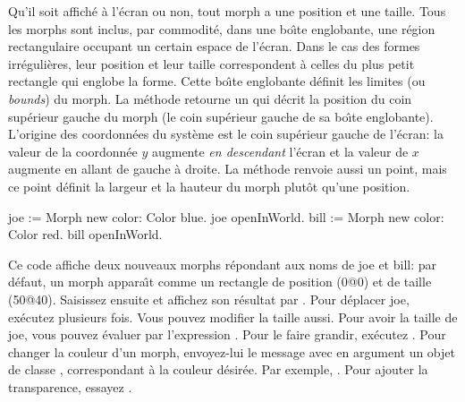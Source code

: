 \documentclass[a4paper,10pt,twoside]{book}
\begin{document}
Qu'il soit affich\'e \`a l'\'ecran ou non, tout morph a une position
et une taille. Tous les morphs sont inclus, par commodit\'e, dans une
bo\^{\i}te englobante, \cad une r\'egion rectangulaire occupant un
certain espace de l'\'ecran. Dans le cas des formes irr\'eguli\`eres,
leur position et leur taille correspondent \`a celles du plus petit
rectangle qui englobe la forme. Cette bo\^{\i}te englobante d\'efinit
les limites (ou \emph{bounds}) du morph. %
La m\'ethode  retourne un  qui
d\'ecrit la position du coin sup\'erieur gauche du morph (\cad le coin
sup\'erieur gauche de sa bo\^{\i}te englobante).
L'origine des coordonn\'ees du syst\`eme est le coin sup\'erieur
gauche de l'\'ecran: la valeur de la coordonn\'ee $y$ augmente
\emph{en descendant} l'\'ecran et la valeur de $x$ augmente en allant
de gauche \`a droite.
La m\'ethode  renvoie aussi un point, mais ce point
d\'efinit la largeur et la hauteur du morph plut\^ot qu'une position.

\begin{code}{}
joe := Morph new color: Color blue.
joe openInWorld.
bill := Morph new color: Color red.
bill openInWorld.
\end{code}
\noindent

Ce code affiche deux nouveaux morphs r\'epondant aux noms de joe et
bill: par d\'efaut, un morph appara\^{\i}t comme  un rectangle de
position (0@0) et de taille (50@40).
Saisissez ensuite  et affichez son r\'esultat par .
Pour d\'eplacer joe, ex\'ecutez  plusieurs fois.
Vous pouvez modifier la taille aussi. Pour avoir la taille de joe,
vous pouvez \'evaluer par  l'expression 
. Pour le faire grandir, ex\'ecutez .
Pour changer la couleur d'un morph, envoyez-lui le message
 avec en argument un objet de classe ,
correspondant \`a la couleur d\'esir\'ee. Par exemple,
.
Pour ajouter la transparence, essayez
.
\end{document}
